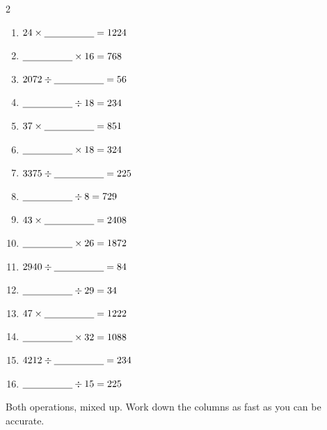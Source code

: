\documentclass[12pt,a4paper]{article}
\begin{document}
\vspace{2pt}
\begin{multicols}{2}
\begin{enumerate}[label=(\alph*), itemsep=12pt]
  \item $24 \times \blank[1.8cm] = 1224$
  \item $\blank[1.8cm] \times 16 = 768$
  \item $2072 \div \blank[1.8cm] = 56$
  \item $\blank[1.8cm] \div 18 = 234$
  \item $37 \times \blank[1.8cm] = 851$
  \item $\blank[1.8cm] \times 18 = 324$
  \item $3375 \div \blank[1.8cm] = 225$
  \item $\blank[1.8cm] \div 8 = 729$
  \item $43 \times \blank[1.8cm] = 2408$
  \item $\blank[1.8cm] \times 26 = 1872$
  \item $2940 \div \blank[1.8cm] = 84$
  \item $\blank[1.8cm] \div 29 = 34$
  \item $47 \times \blank[1.8cm] = 1222$
  \item $\blank[1.8cm] \times 32 = 1088$
  \item $4212 \div \blank[1.8cm] = 234$
  \item $\blank[1.8cm] \div 15 = 225$
\end{enumerate}
\end{multicols}


\noindent Both operations, mixed up. Work down the columns as fast as you can be
accurate. 
\end{document}

